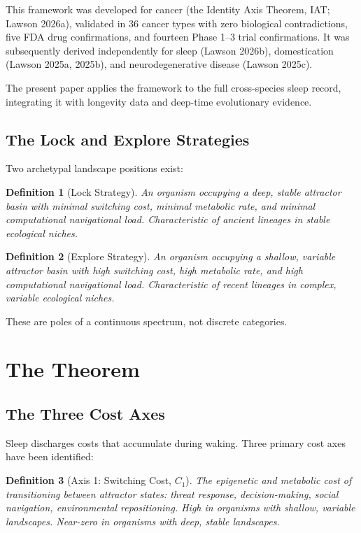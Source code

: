 \documentclass[12pt, a4paper]{article}
\newtheorem{definition}{Definition}
\begin{document}
This framework was developed for cancer (the Identity Axis
Theorem, IAT; Lawson 2026a), validated in 36 cancer types
with zero biological contradictions, five FDA drug
confirmations, and fourteen Phase 1--3 trial confirmations.
It was subsequently derived independently for sleep
(Lawson 2026b), domestication (Lawson 2025a, 2025b), and
neurodegenerative disease (Lawson 2025c).

The present paper applies the framework to the full
cross-species sleep record, integrating it with longevity
data and deep-time evolutionary evidence.

\subsection{The Lock and Explore Strategies}

Two archetypal landscape positions exist:

\begin{definition}[Lock Strategy]
An organism occupying a deep, stable attractor basin with
minimal switching cost, minimal metabolic rate, and minimal
computational navigational load. Characteristic of ancient
lineages in stable ecological niches.
\end{definition}

\begin{definition}[Explore Strategy]
An organism occupying a shallow, variable attractor basin
with high switching cost, high metabolic rate, and high
computational navigational load. Characteristic of recent
lineages in complex, variable ecological niches.
\end{definition}

These are poles of a continuous spectrum, not discrete
categories.

\section{The Theorem}
\label{sec:theorem}

\subsection{The Three Cost Axes}

Sleep discharges costs that accumulate during waking.
Three primary cost axes have been identified:

\begin{definition}[Axis 1: Switching Cost, $C_1$]
The epigenetic and metabolic cost of transitioning between
attractor states: threat response, decision-making, social
navigation, environmental repositioning. High in organisms
with shallow, variable landscapes. Near-zero in organisms
with deep, stable landscapes.
\end{definition}
\end{document}
